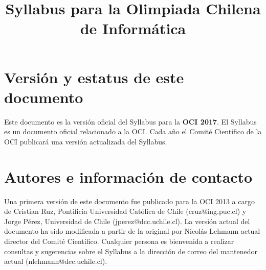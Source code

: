 \documentclass{article}
\begin{document}
\title{Syllabus para la Olimpiada Chilena de Informática}
\date{}
\maketitle

\section{Versión y estatus de este documento}
Este documento es la versión oficial del Syllabus para la \textbf{OCI 2017}.
El Syllabus es un documento oficial relacionado a la OCI.
Cada año el Comité Científico de la OCI publicará una versión actualizada del Syllabus.

\section{Autores e información de contacto}
Una primera versión de este documento fue publicado para la OCI 2013 a cargo de
Cristian Ruz, Pontificia Universidad Católica de Chile (cruz@ing.puc.cl) y
Jorge Pérez, Universidad de Chile (jperez@dcc.uchile.cl).
La versión actual del documento ha sido modificada a partir de la original por Nicolás
Lehmann actual director del Comité Científico.
Cualquier persona es bienvenida a realizar consultas y sugerencias sobre el
Syllabus a la dirección de correo del mantenedor actual (nlehmann@dcc.uchile.cl).
\end{document}
